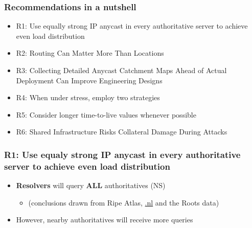 \documentclass[11pt,show 
notes,notheorems,noamsthm,blank]{beamer} %
\begin{document}
\begin{frame}
 \frametitle{Recommendations in a nutshell}
 \begin{itemize}
  \item R1: Use equally strong IP anycast in every authoritative server to
    achieve even load distribution~\cite{Mueller17b}
    
  \item R2:  Routing Can Matter More Than Locations~\cite{Schmidt17a}
  
  \item R3: Collecting Detailed Anycast Catchment Maps Ahead of Actual
    Deployment Can Improve Engineering Designs~\cite{Vries17b}
    
  \item R4:    When under stress, employ two strategies~\cite{Moura16b}
  
  \item R5:  Consider longer time-to-live values whenever 
possible~\cite{Moura18b}
  
    \item R6:  Shared Infrastructure Risks Collateral Damage During 
Attacks~\cite{Moura16b}
    


  

 \end{itemize}

\end{frame}


\begin{frame}
 \frametitle{R1: Use equaly strong IP anycast in every authoritative server to
    achieve even load distribution}
    
    
    
\begin{figure}
\centering

  
  \label{fig:nl-deployment}

\end{figure}
\vspace{-0.2cm}
\begin{itemize}
\item \textbf{Resolvers} will query \textbf{ALL} 
authoritatives (NS) ~\cite{Mueller17b}
\begin{itemize}
 \item (conclusions drawn from Ripe Atlas, \url{.nl} and the Roots data)
\end{itemize}

\item However, nearby authoritatives  will receive more queries


\end{itemize}



\end{frame}
\end{document}
